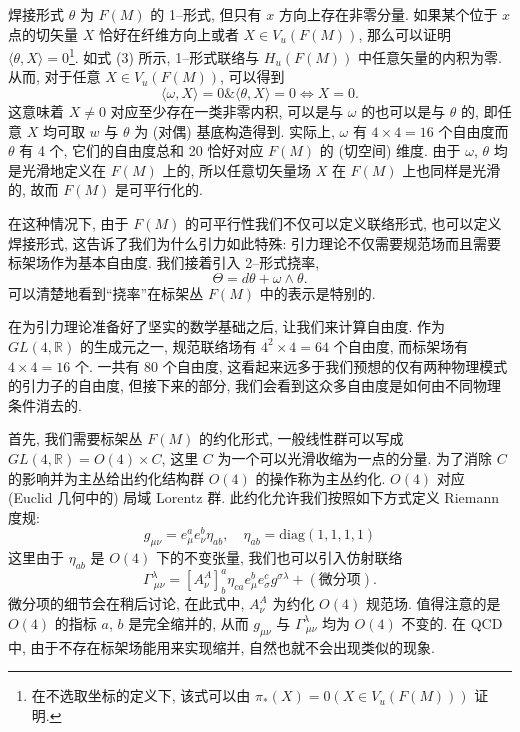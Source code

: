 \documentclass{article}
\begin{document}
焊接形式 $\theta$ 为 $F(M)$ 的 1--形式, 但只有 $x$ 方向上存在非零分量. 如果某个位于 $x$ 点的切矢量 $X$ 恰好在纤维方向上或者 $X\in V_{u}(F(M))$, 那么可以证明 $\langle\theta,X\rangle=0$\footnote{在不选取坐标的定义下, 该式可以由 $\pi_{*}(X)=0(X\in V_{u}(F(M)))$ 证明.}. 如式 (3) 所示, 1--形式联络与 $H_{u}(F(M))$ 中任意矢量的内积为零. 从而, 对于任意 $X\in V_{u}(F(M))$, 可以得到
\begin{equation}
\langle\omega, X\rangle=0\&\langle \theta, X\rangle=0\Leftrightarrow X=0.
\end{equation}
这意味着 $X\neq 0$ 对应至少存在一类非零内积, 可以是与 $\omega$ 的也可以是与 $\theta$ 的, 即任意 $X$ 均可取 $w$ 与 $\theta$ 为 (对偶) 基底构造得到. 实际上, $\omega$ 有 $4\times4=16$ 个自由度而 $\theta$ 有 4 个, 它们的自由度总和 20 恰好对应 $F(M)$ 的 (切空间) 维度. 由于 $\omega$, $\theta$ 均是光滑地定义在 $F(M)$ 上的, 所以任意切矢量场 $X$ 在 $F(M)$ 上也同样是光滑的, 故而 $F(M)$ 是可平行化的.

在这种情况下, 由于 $F(M)$ 的可平行性我们不仅可以定义联络形式, 也可以定义焊接形式, 这告诉了我们为什么引力如此特殊: 引力理论不仅需要规范场而且需要标架场作为基本自由度. 我们接着引入 2--形式挠率,
\begin{equation}
\Theta=d\theta+\omega\wedge \theta.
\end{equation}
可以清楚地看到“挠率”在标架丛 $F(M)$ 中的表示是特别的.

在为引力理论准备好了坚实的数学基础之后, 让我们来计算自由度. 作为 $GL(4,\mathbb{R})$ 的生成元之一, 规范联络场有 $4^{2}\times4=64$ 个自由度, 而标架场有 $4\times4=16$ 个. 一共有 80 个自由度, 这看起来远多于我们预想的仅有两种物理模式的引力子的自由度, 但接下来的部分, 我们会看到这众多自由度是如何由不同物理条件消去的.

首先, 我们需要标架丛 $F(M)$ 的约化形式, 一般线性群可以写成  $GL(4,\mathbb{R})=O(4)\times C$, 这里 $C$ 为一个可以光滑收缩为一点的分量. 为了消除 $C$ 的影响并为主丛给出约化结构群 $O(4)$ 的操作称为主丛约化. $O(4)$ 对应 (Euclid 几何中的) 局域 Lorentz 群. 此约化允许我们按照如下方式定义 Riemann 度规:
\begin{equation}
g_{\mu\nu}=e_{\mu}^{a}e^{b}_{\nu}\eta_{ab}, \quad\eta_{ab}=\textrm{diag}(1,1,1,1)
\end{equation}
这里由于 $\eta_{ab}$ 是 $O(4)$ 下的不变张量, 我们也可以引入仿射联络
\begin{equation}
\Gamma_{\ \mu\nu}^{\lambda}=[A_{\nu}^{A}]_{b}^{a}\eta_{ca}e_{\mu}^{b}e_{\sigma}^{c}g^{\sigma\lambda}+(\textrm{微分项}).
\end{equation}
微分项的细节会在稍后讨论, 在此式中, $A_{\nu}^{A}$ 为约化 $O(4)$ 规范场. 值得注意的是 $O(4)$ 的指标 $a$, $b$ 是完全缩并的, 从而 $g_{\mu\nu}$ 与 $\Gamma_{\ \mu\nu}^{\lambda}$ 均为 $O(4)$ 不变的. 在 QCD 中, 由于不存在标架场能用来实现缩并, 自然也就不会出现类似的现象.
\end{document}
